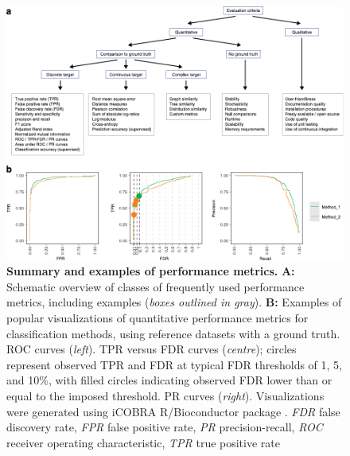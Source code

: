 \begin{figure}[htb!]
	\centering
	\includegraphics[width=\hugefigure]{fig/essential_guidelines_figure2} 
	\caption{\textbf{Summary and examples of performance metrics.} \textbf{A:} Schematic overview of classes of frequently used performance metrics, including examples (\textit{boxes outlined in gray}). \textbf{B:} Examples of popular visualizations of quantitative performance metrics for classification methods, using reference datasets with a ground truth. ROC curves (\textit{left}). TPR versus FDR curves (\textit{centre}); circles represent observed TPR and FDR at typical FDR thresholds of 1, 5, and 10\%, with filled circles indicating observed FDR lower than or equal to the imposed threshold. PR curves (\textit{right}). Visualizations were generated using iCOBRA R/Bioconductor package \cite{soneson_icobraopenreproducible_2016}. \textit{FDR} false discovery rate, \textit{FPR} false positive rate, \textit{PR} precision-recall, \textit{ROC} receiver operating characteristic, \textit{TPR} true positive rate}
	\label{fig:fig2_metrics}
\end{figure}


